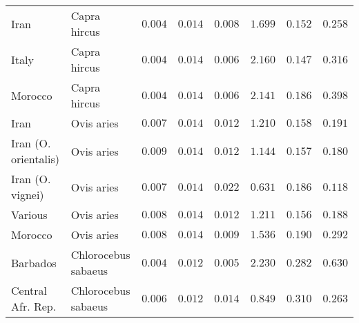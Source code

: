 \documentclass[12pt]{article}
\begin{document}
\begin{center}
\begin{longtable*}{|l|l|r|r|r|r|r|r|}
             Iran &        Capra hircus &               $ 0.004$ &              $ 0.014$ &              $ 0.008$ &                                          $ 1.699$ &                         $ 0.152$ &                      $ 0.258$ \\
             Italy &        Capra hircus &               $ 0.004$ &              $ 0.014$ &              $ 0.006$ &                                          $ 2.160$ &                         $ 0.147$ &                      $ 0.316$ \\
             Morocco &        Capra hircus &               $ 0.004$ &              $ 0.014$ &              $ 0.006$ &                                          $ 2.141$ &                         $ 0.186$ &                      $ 0.398$ \\
            Iran &          Ovis aries &               $ 0.007$ &              $ 0.014$ &              $ 0.012$ &                                          $ 1.210$ &                         $ 0.158$ &                      $ 0.191$ \\
            Iran (O. orientalis) &          Ovis aries &               $ 0.009$ &              $ 0.014$ &              $ 0.012$ &                                          $ 1.144$ &                         $ 0.157$ &                      $ 0.180$ \\
            Iran (O. vignei) &          Ovis aries &               $ 0.007$ &              $ 0.014$ &              $ 0.022$ &                                          $ 0.631$ &                         $ 0.186$ &                      $ 0.118$ \\
            Various &          Ovis aries &               $ 0.008$ &              $ 0.014$ &              $ 0.012$ &                                          $ 1.211$ &                         $ 0.156$ &                      $ 0.188$ \\
            Morocco &          Ovis aries &               $ 0.008$ &              $ 0.014$ &              $ 0.009$ &                                          $ 1.536$ &                         $ 0.190$ &                      $ 0.292$ \\
             Barbados & Chlorocebus sabaeus &               $ 0.004$ &              $ 0.012$ &              $ 0.005$ &                                          $ 2.230$ &                         $ 0.282$ &                      $ 0.630$ \\
             Central Afr. Rep. & Chlorocebus sabaeus &               $ 0.006$ &              $ 0.012$ &              $ 0.014$ &                                          $ 0.849$ &                         $ 0.310$ &                      $ 0.263$ \\

\end{longtable*}
\end{center}
\end{document}

